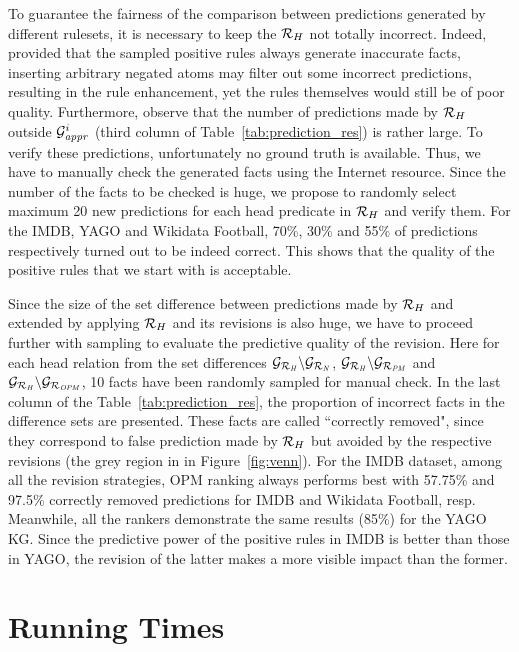 To guarantee the fairness of the comparison between predictions generated by different rulesets, it is necessary to keep the $\mathcal{R}_H$ not totally incorrect. Indeed, provided that the sampled positive rules always generate inaccurate facts, inserting arbitrary negated atoms may filter out some incorrect predictions, resulting in the rule enhancement, yet the rules themselves would still be of poor quality. Furthermore, observe that the number of predictions made by $\mathcal{R}_H$ outside $\mathcal{G}^i_{\mathit{appr}}$ (third column of Table~\ref{tab:prediction_res}) is rather large. To verify these predictions, unfortunately no ground truth is available. Thus, we have to manually check the generated facts using the Internet resource. Since the number of the facts to be checked is huge, we propose to randomly select maximum 20 new predictions for each head predicate in $\mathcal{R}_H$ and verify them. For the IMDB, YAGO and Wikidata Football, 70\%, 30\% and 55\% of predictions respectively turned out to be indeed correct. This shows that the quality of the positive rules that we start with is acceptable.

Since the size of the set difference between predictions made by $\mathcal{R}_H$ and extended by applying $\mathcal{R}_H$ and its revisions is also huge, we have to proceed further with sampling to evaluate the predictive quality of the revision. Here for each head relation from the set differences $\mathcal{G}_{\mathcal{R}_{\mathit{H}}}\backslash \mathcal{G}_{\mathcal{R}_{\mathit{N}}}$, $\mathcal{G}_{\mathcal{R}_{\mathit{H}}}\backslash \mathcal{G}_{\mathcal{R}_{\mathit{PM}}}$ and $\mathcal{G}_{\mathcal{R}_{\mathit{H}}}\backslash \mathcal{G}_{\mathcal{R}_{\mathit{OPM}}}$, 10 facts have been randomly sampled for manual check. In the last column of the Table~\ref{tab:prediction_res}, the proportion of incorrect facts in the difference sets are presented. These facts are called ``correctly removed", since they correspond to false prediction made by $\mathcal{R}_H$ but avoided by the respective revisions (the grey region in in Figure~\ref{fig:venn}). For the IMDB dataset, among all the revision strategies, OPM ranking always performs best with 57.75\% and 97.5\% correctly removed predictions for IMDB and Wikidata Football, resp. Meanwhile, all the rankers demonstrate the same results (85\%) for the YAGO KG. Since the predictive power of the positive rules in IMDB is better than those in YAGO, the revision of the latter makes a more visible impact than the former.

\section{Running Times}

